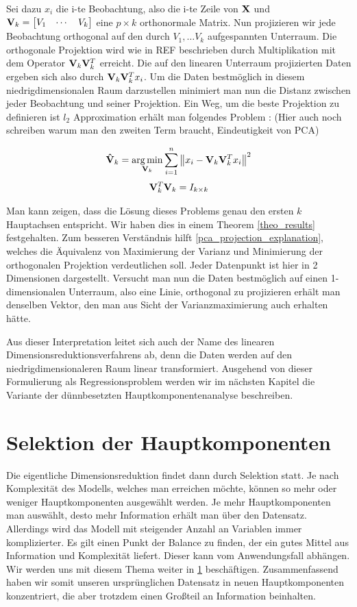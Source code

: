 Sei dazu $x_i$ die i-te Beobachtung, also die i-te Zeile von $\mathbf{X}$ und $\mathbf{V}_k = \begin{bmatrix} V_1 & \cdots & V_k \end{bmatrix}$ eine $p \times k$ orthonormale Matrix. Nun projizieren wir jede Beobachtung orthogonal auf den durch $V_1, \ldots V_k$ aufgespannten Unterraum. Die orthogonale Projektion wird wie in REF beschrieben durch Multiplikation mit dem Operator $\mathbf{V}_k \mathbf{V}_k^T$ erreicht. Die auf den linearen Unterraum projizierten Daten ergeben sich also durch $\mathbf{V}_k \mathbf{V}_k^T x_i$. Um die Daten bestmöglich in diesem niedrigdimensionalen Raum darzustellen minimiert man nun die Distanz zwischen jeder Beobachtung und seiner Projektion. Ein Weg, um die beste Projektion zu definieren ist $l_2$ Approximation erhält man folgendes Problem \cite{zou_sparsepca}: (Hier auch noch schreiben warum man den zweiten Term braucht, Eindeutigkeit von PCA)

\label{pca_regression_formulation}
$$\mathbf{\hat{V}}_k = \operatorname*{arg\,min}_{\mathbf{V}_k} \sum_{i=1}^{n} \left\lVert x_i - \mathbf{V}_k \mathbf{V}_k^Tx_i \right\rVert^2$$
$$\mathbf{V}_k^T\mathbf{V}_k = I_{k \times k}$$

Man kann zeigen, dass die Lösung dieses Problems genau den ersten $k$ Hauptachsen entspricht. Wir haben dies in einem Theorem \ref{theo_results} festgehalten.  \cite{vidal} Zum besseren Verständnis hilft \ref{pca_projection_explanation}, welches die Äquivalenz von Maximierung der Varianz und Minimierung der orthogonalen Projektion verdeutlichen soll. Jeder Datenpunkt ist hier in 2 Dimensionen dargestellt. Versucht man nun die Daten bestmöglich auf einen 1-dimensionalen Unterraum, also eine Linie, orthogonal zu projizieren erhält man denselben Vektor, den man aus Sicht der Varianzmaximierung auch erhalten hätte. 

Aus dieser Interpretation leitet sich auch der Name des linearen Dimensionsreduktionsverfahrens ab, denn die Daten werden auf den niedrigdimensionaleren Raum linear transformiert. Ausgehend von dieser Formulierung als Regressionsproblem werden wir im nächsten Kapitel die Variante der dünnbesetzten Hauptkomponentenanalyse beschreiben.


\section{Selektion der Hauptkomponenten}
\label{selection_principal_components}

Die eigentliche Dimensionsreduktion findet dann durch Selektion statt. Je nach Komplexität des Modells, welches man erreichen möchte, können so mehr oder weniger Hauptkomponenten ausgewählt werden. Je mehr Hauptkomponenten man auswählt, desto mehr Information erhält man über den Datensatz. Allerdings wird das Modell mit steigender Anzahl an Variablen immer komplizierter. Es gilt einen Punkt der Balance zu finden, der ein gutes Mittel aus Information und Komplexität liefert. Dieser kann vom Anwendungsfall abhängen. Wir werden uns mit diesem Thema weiter in \ref{selection_principal_components} beschäftigen.
Zusammenfassend haben wir somit unseren ursprünglichen Datensatz in neuen Hauptkomponenten konzentriert, die aber trotzdem einen Großteil an Information beinhalten.

